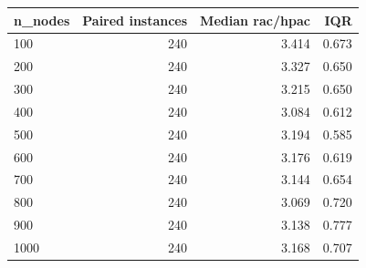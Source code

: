 \begin{tabular}{lrrr}
\toprule
n\_nodes & Paired instances & Median rac/hpac & IQR \\
\midrule
100 & 240 & 3.414 & 0.673 \\
200 & 240 & 3.327 & 0.650 \\
300 & 240 & 3.215 & 0.650 \\
400 & 240 & 3.084 & 0.612 \\
500 & 240 & 3.194 & 0.585 \\
600 & 240 & 3.176 & 0.619 \\
700 & 240 & 3.144 & 0.654 \\
800 & 240 & 3.069 & 0.720 \\
900 & 240 & 3.138 & 0.777 \\
1000 & 240 & 3.168 & 0.707 \\
\bottomrule
\end{tabular}
